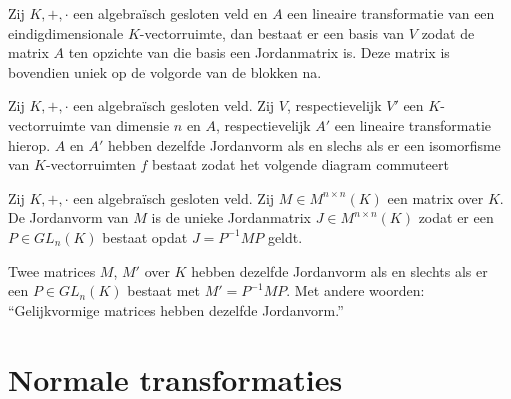 \documentclass[main.tex]{subfiles}
\begin{document}
\begin{st}
  Zij $K,+,\cdot$ een algebra\"isch gesloten veld en $A$ een lineaire transformatie van een eindigdimensionale $K$-vectorruimte, dan bestaat er een basis van $V$ zodat de matrix $A$ ten opzichte van die basis een Jordanmatrix is.
  Deze matrix is bovendien uniek op de volgorde van de blokken na.
\end{st}

\begin{ei}
  Zij $K,+,\cdot$ een algebra\"isch gesloten veld.
  Zij $V$, respectievelijk $V'$ een $K$-vectorruimte van dimensie $n$ en $A$, respectievelijk $A'$ een lineaire transformatie hierop.
  $A$ en $A'$ hebben dezelfde Jordanvorm als en slechs als er een isomorfisme van $K$-vectorruimten $f$ bestaat zodat het volgende diagram commuteert
  \begin{figure}[H]
    \centering
  \end{figure}
\end{ei}

\begin{de}
  Zij $K,+,\cdot$ een algebra\"isch gesloten veld.
  Zij $M\in M^{n\times n}(K)$ een matrix over $K$.
  De Jordanvorm van $M$ is de unieke Jordanmatrix $J\in M^{n\times n}(K)$ zodat er een $P\in GL_{n}(K)$ bestaat opdat $J = P^{-1}MP$ geldt.
\end{de}

\begin{pr}
  Twee matrices $M$, $M'$ over $K$ hebben dezelfde Jordanvorm als en slechts als er een $P\in GL_{n}(K)$ bestaat met $M' = P^{-1}MP$.
  Met andere woorden: ``Gelijkvormige matrices hebben dezelfde Jordanvorm.''
\end{pr}

\section{Normale transformaties}
\label{sec:norm-transf}
\end{document}
